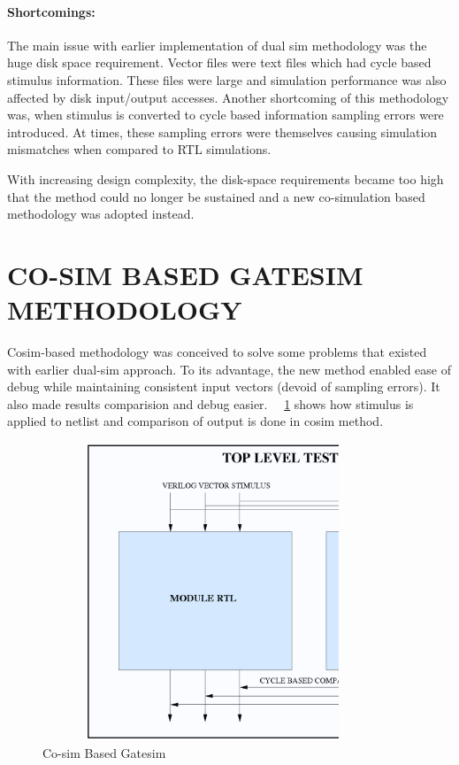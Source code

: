 \paragraph{Shortcomings:}The main issue with earlier implementation of dual sim methodology was the huge disk space requirement. Vector files were text files which had cycle based stimulus information. These files were large and simulation performance was also affected by disk input/output accesses. Another shortcoming of this methodology was, when stimulus is converted to cycle based information sampling errors were introduced. At times, these sampling errors were themselves causing simulation mismatches when compared to RTL simulations.

 
 With increasing design complexity, the disk-space requirements became too high that the method could no longer be sustained and a new co-simulation based methodology was adopted instead.





\section{CO-SIM BASED GATESIM METHODOLOGY}
 Cosim-based methodology was conceived to solve some problems that existed with earlier dual-sim approach. To its advantage, the new method enabled ease of debug while maintaining consistent input vectors (devoid of sampling errors). It also made results comparision and debug easier. ~\figurename{~\ref{fig:cosim.ps}} shows how stimulus is applied to netlist and comparison of output is done in cosim method. %
 
\begin{figure}[h!]
\centering
\includegraphics[width=4in, height=3.5in]{./figures/cosim.ps}
\caption{Co-sim Based Gatesim}
\label{fig:cosim.ps}
\end{figure}


